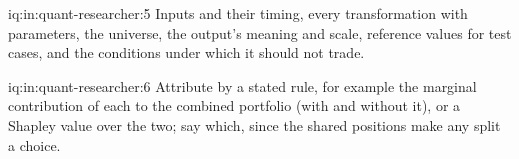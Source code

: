 \begin{solution}{iq:in:quant-researcher:5}
Inputs and their timing, every transformation with parameters, the universe, the output's meaning and scale, reference
values for test cases, and the conditions under which it should not trade.
\end{solution}

\begin{solution}{iq:in:quant-researcher:6}
Attribute by a stated rule, for example the marginal contribution of each to the combined portfolio (with and without it),
or a Shapley value over the two; say which, since the shared positions make any split a choice.
\end{solution}
